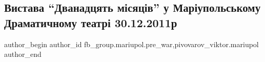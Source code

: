 
 
 
 
 

\subsection{Вистава \enquote{Дванадцять місяців} у Маріупольському Драматичному театрі 30.12.2011р}
\label{sec:03_03_2023.fb.fb_group.mariupol.pre_war.1.vistava__dvanadtsyat}
 
\ifcmt
 author_begin
   author_id fb_group.mariupol.pre_war,pivovarov_viktor.mariupol
 author_end
\fi

